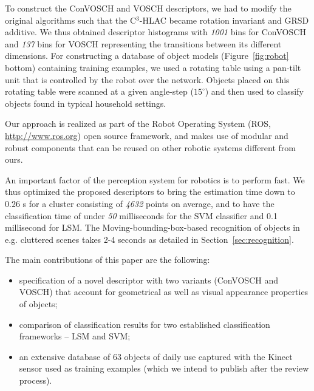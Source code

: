 \documentclass[a4paper, 10 pt, conference]{sty/ieeeconf}
\begin{document}
To construct the ConVOSCH and VOSCH descriptors, we had to modify the original algorithms
such that the C$^3$-HLAC became rotation invariant and GRSD 
additive. We thus obtained descriptor histograms with 
\emph{1001} bins for ConVOSCH and \emph{137} bins for VOSCH representing the transitions between its different dimensions.
For constructing a database of object models (Figure~\ref{fig:robot} bottom)
containing training examples, we used a rotating
table using a pan-tilt unit that is controlled by the robot over the
network. Objects placed on this rotating table were scanned at a given
angle-step ($15^\circ$) and then used to classify objects found in
typical household settings.

Our approach is realized as part of the Robot Operating System
(ROS, \url{http://www.ros.org}) open source framework, and makes
use of modular and robust components that can be reused on other robotic
systems different from ours.

An important factor of the perception system for robotics is to perform fast. We thus optimized
the proposed descriptors to bring the estimation time down to $0.26$ s for a cluster consisting of 
\emph{4632} points on average, and to have the classification time of under \emph{50} milliseconds
for the SVM classifier and 0.1 millisecond for LSM. The Moving-bounding-box-based
recognition of objects in e.g. cluttered scenes takes 2-4 seconds as detailed
in Section~\ref{sec:recognition}.

The main contributions of this paper are the following:
\begin{itemize}
\item specification of a novel descriptor with two variants (ConVOSCH and VOSCH) that account for
geometrical as well as visual appearance  properties of objects;
\item comparison of classification results for two established classification
frameworks -- LSM and SVM;
\item an extensive database of 63 objects of daily use captured with the Kinect sensor
used as training examples (which we intend to publish after the review process).
\end{itemize}
\end{document}

